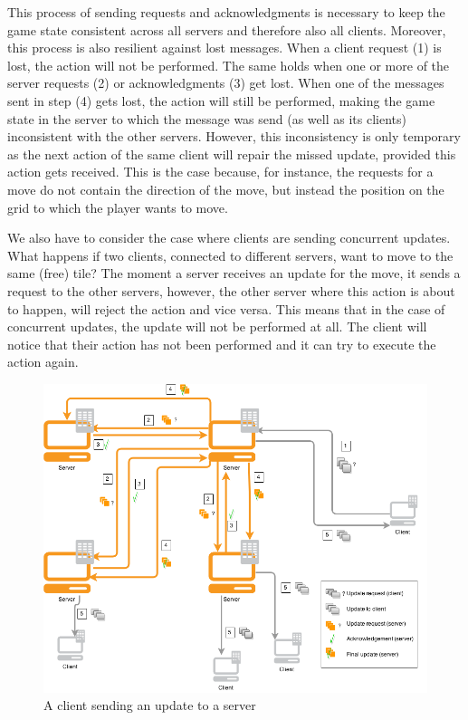 This process of sending requests and acknowledgments is necessary to keep the game state consistent across all servers and therefore also all clients. 
Moreover, this process is also resilient against lost messages. 
When a client request (1) is lost, the action will not be performed. 
The same holds when one or more of the server requests (2) or acknowledgments (3) get lost. 
When one of the messages sent in step (4) gets lost, the action will still be performed, making the game state in the server to which the message was send (as well as its clients) inconsistent with the other servers. 
However, this inconsistency is only temporary as the next action of the same client will repair the missed update, provided this action gets received. 
This is the case because, for instance, the requests for a move do not contain the direction of the move, but instead the position on the grid to which the player wants to move.

We also have to consider the case where clients are sending concurrent updates. 
What happens if two clients, connected to different servers, want to move to the same (free) tile? 
The moment a server receives an update for the move, it sends a request to the other servers, however, the other server where this action is about to happen, will reject the action and vice versa. 
This means that in the case of concurrent updates, the update will not be performed at all. The client will notice that their action has not been performed and it can try to execute the action again.

\begin{figure}[h!]
  \centering
    \includegraphics[width=\textwidth]{diagrams/game-update}
    
  \caption{A client sending an update to a server}
  \label{fig:update_diagram}
\end{figure}

